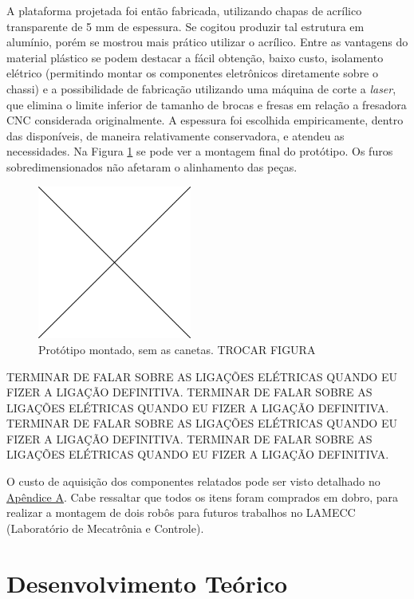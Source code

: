 A plataforma projetada foi então fabricada, utilizando chapas de acrílico transparente de 5 mm de espessura. Se cogitou produzir tal estrutura em alumínio, porém se mostrou mais prático utilizar o acrílico. Entre as vantagens do material plástico se podem destacar a fácil obtenção, baixo custo, isolamento elétrico (permitindo montar os componentes eletrônicos diretamente sobre o chassi) e a possibilidade de fabricação utilizando uma máquina de corte a \textit{laser}, que elimina o limite inferior de tamanho de brocas e fresas em relação a fresadora CNC considerada originalmente. A espessura foi escolhida empiricamente, dentro das disponíveis, de maneira relativamente conservadora, e atendeu as necessidades. Na Figura \ref{fig:montagem} se pode ver a montagem final do protótipo. Os furos sobredimensionados não afetaram o alinhamento das peças.

\begin{figure}[h]
  \centering
  \includegraphics[width = 0.45\textwidth]{imagens/edc}
  \caption{Protótipo montado, sem as canetas. TROCAR FIGURA}
  \label{fig:montagem}
\end{figure}

TERMINAR DE FALAR SOBRE AS LIGAÇÕES ELÉTRICAS QUANDO EU FIZER A LIGAÇÃO DEFINITIVA.
TERMINAR DE FALAR SOBRE AS LIGAÇÕES ELÉTRICAS QUANDO EU FIZER A LIGAÇÃO DEFINITIVA.
TERMINAR DE FALAR SOBRE AS LIGAÇÕES ELÉTRICAS QUANDO EU FIZER A LIGAÇÃO DEFINITIVA.
TERMINAR DE FALAR SOBRE AS LIGAÇÕES ELÉTRICAS QUANDO EU FIZER A LIGAÇÃO DEFINITIVA.

O custo de aquisição dos componentes relatados pode ser visto detalhado no \hyperref[sec:custo]{Apêndice A}. Cabe ressaltar que todos os itens foram comprados em dobro, para realizar a montagem de dois robôs para futuros trabalhos no LAMECC (Laboratório de Mecatrônia e Controle).

\section{Desenvolvimento Teórico}
\label{sec:teorico}

